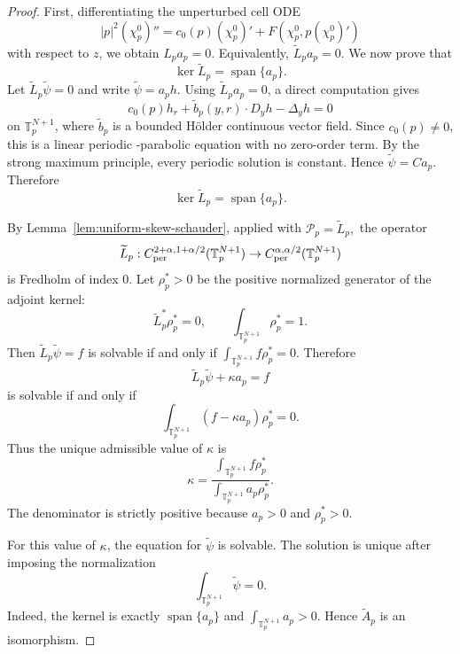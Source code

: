 \documentclass[preprint]{elsarticle}
\numberwithin{equation}{section}
\begin{document}
\begin{proof}
First, differentiating the unperturbed cell ODE
\begin{equation*}
|p|^2(\chi_p^0)''
=
c_0(p)(\chi_p^0)'
+
F(\chi_p^0,p(\chi_p^0)')
\end{equation*}
with respect to $z$, we obtain $L_pa_p=0.$
Equivalently, $\widetilde L_pa_p=0.$
We now prove that
\begin{equation*}
\ker \widetilde L_p=\operatorname{span}\{a_p\}.
\end{equation*}
Let $\widetilde L_p\widetilde\psi=0$ and write
$
\widetilde\psi=a_ph.
$
Using $\widetilde L_pa_p=0$, a direct computation gives
\begin{equation*}
c_0(p)h_r
+
\widetilde b_p(y,r)\cdot D_yh
-
\Delta_yh=0
\end{equation*}
on $\mathbb T_p^{N+1}$, where $\widetilde b_p$ is a bounded Hölder continuous vector field. Since $c_0(p)\ne0$, this is a linear periodic -parabolic equation with no zero-order term. By the strong maximum principle, every periodic solution is constant. Hence
$
\widetilde\psi=Ca_p.
$
Therefore
\begin{equation*}
\ker \widetilde L_p=\operatorname{span}\{a_p\}.
\end{equation*}

By Lemma~\ref{lem:uniform-skew-schauder}, applied with
$
\mathcal P_p=\widetilde L_p,
$
the operator
$$
\widetilde L_p:
C_{\rm per}^{2+\alpha,1+\alpha/2}(\mathbb T_p^{N+1})
\to
C_{\rm per}^{\alpha,\alpha/2}(\mathbb T_p^{N+1})
$$
is Fredholm of index $0$. Let $\rho_p^*>0$ be the positive normalized generator of the adjoint kernel:
\begin{equation*}
\widetilde L_p^*\rho_p^*=0,
\qquad
\int_{\mathbb T_p^{N+1}}\rho_p^*=1.
\end{equation*}
Then
$
\widetilde L_p\widetilde\psi=f
$
is solvable if and only if $\int_{\mathbb T_p^{N+1}}f\rho_p^*=0.$
Therefore
$$
\widetilde L_p\widetilde\psi+\kappa a_p=f
$$
is solvable if and only if
\begin{equation*}
\int_{\mathbb T_p^{N+1}}(f-\kappa a_p)\rho_p^*=0.
\end{equation*}
Thus the unique admissible value of $\kappa$ is
\begin{equation*}
\kappa
=
\frac{
\int_{\mathbb T_p^{N+1}}f\rho_p^*
}{
\int_{\mathbb T_p^{N+1}}a_p\rho_p^*
}.
\end{equation*}
The denominator is strictly positive because $a_p>0$ and $\rho_p^*>0$.

For this value of $\kappa$, the equation for $\widetilde\psi$ is solvable. The solution is unique after imposing the normalization
\begin{equation*}
\int_{\mathbb T_p^{N+1}}\widetilde\psi=0.
\end{equation*}
Indeed, the kernel is exactly $\operatorname{span}\{a_p\}$ and
$
\int_{\mathbb T_p^{N+1}}a_p>0.
$
Hence $\widetilde A_p$ is an isomorphism.
\end{proof}
\end{document}
